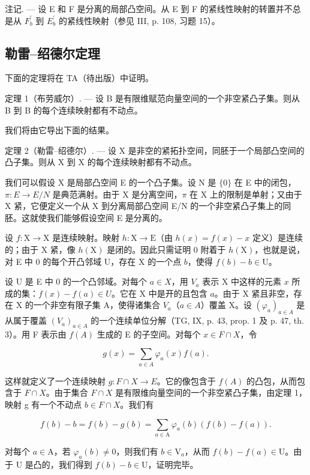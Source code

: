 注记. --- 设 E 和 F 是分离的局部凸空间。从 E 到 F 的紧线性映射的转置并不总是从 \(F_{b}^{\prime}\) 到 \(E_{b}^{\prime}\) 的紧线性映射（参见 III, p. 108, 习题 15）。

\subsection{勒雷--绍德尔定理}

下面的定理将在 TA（待出版）中证明。

定理 1（布劳威尔）. --- 设 B 是有限维赋范向量空间的一个非空紧凸子集。则从 B 到 B 的每个连续映射都有不动点。

我们将由它导出下面的结果。

定理 2（勒雷--绍德尔）. --- 设 X 是非空的紧拓扑空间，同胚于一个局部凸空间的凸子集。则从 X 到 X 的每个连续映射都有不动点。

我们可以假设 X 是局部凸空间 E 的一个凸子集。设 N 是 \(\{0\}\) 在 E 中的闭包，\(\pi: E \rightarrow E/N\) 是典范满射。由于 X 是分离空间，\(\pi\) 在 X 上的限制是单射；又由于 X 紧，它便定义一个从 X 到分离局部凸空间 E/N 的一个非空紧凸子集上的同胚。这就使我们能够假设空间 E 是分离的。

设 \(f: \mathrm{X} \to \mathrm{X}\) 是连续映射。映射 \(h: \mathrm{X} \to \mathrm{E}\)（由 \(h(x) = f(x) - x\) 定义）是连续的；由于 X 紧，像 \(h(\mathrm{X})\) 是闭的。因此只需证明 0 附着于 \(h(\mathrm{X})\)，也就是说，对 E 中 0 的每个开凸邻域 U，存在 X 的一个点 \(b\)，使得 \(f(b) - b \in \mathrm{U}\)。

设 U 是 E 中 0 的一个凸邻域。对每个 \(a \in X\)，用 \(V_a\) 表示 X 中这样的元素 \(x\) 所成的集：\(f(x) - f(a) \in U\)。它在 X 中是开的且包含 \(a\)。由于 X 紧且非空，存在 X 的一个非空有限子集 A，使得诸集合 \(V_a\)（\(a \in A\)）覆盖 X。设 \((\varphi_a)_{a \in A}\) 是从属于覆盖 \((V_a)_{a \in A}\) 的一个连续单位分解（TG, IX, p. 43, prop. 1 及 p. 47, th. 3）。用 F 表示由 \(f(A)\) 生成的 E 的子空间。对每个 \(x \in F \cap X\)，令

\[
g (x) = \sum_ {a \in A} \varphi_ {a} (x) f (a).
\]

这样就定义了一个连续映射 \(g: F \cap X \to E\)。它的像包含于 \(f(A)\) 的凸包，从而包含于 \(F \cap X\)。由于集合 \(F \cap X\) 是有限维向量空间的一个非空紧凸子集，由定理 1，映射 g 有一个不动点 \(b \in F \cap X\)。我们有

\[
f (b) - b = f (b) - g (b) = \sum_ {a \in \mathrm{A}} \varphi_ {a} (b) (f (b) - f (a)).
\]

对每个 \(a \in \mathrm{A}\)，若 \(\varphi_{a}(b) \neq 0\)，则我们有 \(b \in \mathrm{V}_{a}\)，从而 \(f(b) - f(a) \in \mathrm{U}\)。由于 U 是凸的，我们得到 \(f(b) - b \in \mathrm{U}\)，证明完毕。

